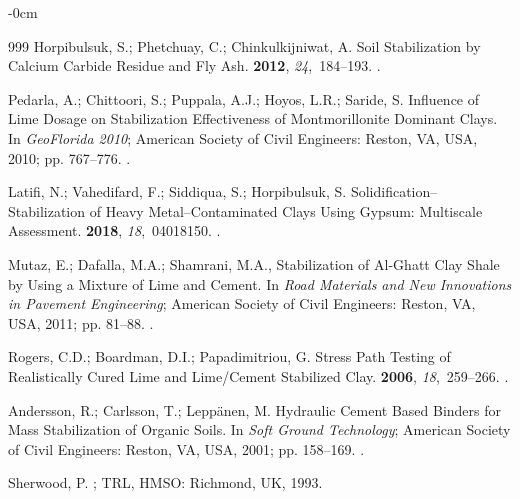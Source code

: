 \documentclass[constrmater,article,accept,pdftex,moreauthors]{Definitions/mdpi}
\begin{document}
\begin{adjustwidth}{-\extralength}{0cm}
\begin{thebibliography}{999}
Horpibulsuk, S.; Phetchuay, C.; Chinkulkijniwat, A.
\newblock Soil Stabilization by Calcium Carbide Residue and Fly Ash.
 {\bf 2012}, {\em
  24},~184--193.
.

Pedarla, A.; Chittoori, S.; Puppala, A.J.; Hoyos, L.R.; Saride, S. Influence
  of Lime Dosage on Stabilization Effectiveness of Montmorillonite Dominant
  Clays.
\newblock In {\em GeoFlorida 2010}; American Society of Civil Engineers: Reston, VA, USA, 2010;
  pp. 767--776.
.

Latifi, N.; Vahedifard, F.; Siddiqua, S.; Horpibulsuk, S.
\newblock Solidification--Stabilization of Heavy Metal--Contaminated Clays
  Using Gypsum: Multiscale Assessment.
 {\bf 2018}, {\em
  18},~04018150.
.

Mutaz, E.; Dafalla, M.A.; Shamrani, M.A., Stabilization of Al-Ghatt Clay Shale
  by Using a Mixture of Lime and Cement.
\newblock In {\em Road Materials and New Innovations in Pavement Engineering};
  American Society of Civil Engineers: Reston, VA, USA, 2011; pp. 81--88.
.

Rogers, C.D.; Boardman, D.I.; Papadimitriou, G.
\newblock Stress Path Testing of Realistically Cured Lime and Lime/Cement
  Stabilized Clay.
 {\bf 2006}, {\em
  18},~259--266.
.

Andersson, R.; Carlsson, T.; Leppänen, M. Hydraulic Cement Based Binders for
  Mass Stabilization of Organic Soils.
\newblock In {\em Soft Ground Technology}; American Society of Civil Engineers: Reston, VA, USA, 
   2001; pp. 158--169.
.

Sherwood, P.
; TRL, HMSO: Richmond, UK, %
 1993.


\end{thebibliography}
\end{adjustwidth}
\end{document}
